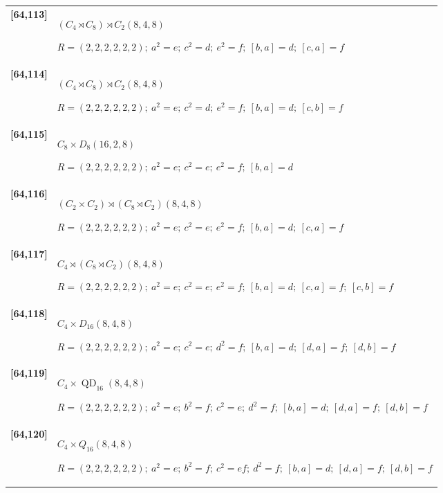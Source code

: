 \documentclass[UTF8,fontset=fandol,11pt,a4paper]{ctexart}
\begin{document}
\begin{longtable}{@{}p{17mm}>{\raggedright\arraybackslash}p{141mm}@{}}
\textbf{[64,113]} & $(C_{4}\rtimes C_{8})\rtimes C_{2}$\quad $(8,4,8)$\par\(R=(2,2,2,2,2,2);\allowbreak\ a^{2}=e;\allowbreak\ c^{2}=d;\allowbreak\ e^{2}=f;\allowbreak\ [b,a]=d;\allowbreak\ [c,a]=f\)\\[3pt]

\textbf{[64,114]} & $(C_{4}\rtimes C_{8})\rtimes C_{2}$\quad $(8,4,8)$\par\(R=(2,2,2,2,2,2);\allowbreak\ a^{2}=e;\allowbreak\ c^{2}=d;\allowbreak\ e^{2}=f;\allowbreak\ [b,a]=d;\allowbreak\ [c,b]=f\)\\[3pt]

\textbf{[64,115]} & $C_{8}\times D_{8}$\quad $(16,2,8)$\par\(R=(2,2,2,2,2,2);\allowbreak\ a^{2}=e;\allowbreak\ c^{2}=e;\allowbreak\ e^{2}=f;\allowbreak\ [b,a]=d\)\\[3pt]

\textbf{[64,116]} & $(C_{2}\times C_{2})\rtimes (C_{8}\rtimes C_{2})$\quad $(8,4,8)$\par\(R=(2,2,2,2,2,2);\allowbreak\ a^{2}=e;\allowbreak\ c^{2}=e;\allowbreak\ e^{2}=f;\allowbreak\ [b,a]=d;\allowbreak\ [c,a]=f\)\\[3pt]

\textbf{[64,117]} & $C_{4}\rtimes (C_{8}\rtimes C_{2})$\quad $(8,4,8)$\par\(R=(2,2,2,2,2,2);\allowbreak\ a^{2}=e;\allowbreak\ c^{2}=e;\allowbreak\ e^{2}=f;\allowbreak\ [b,a]=d;\allowbreak\ [c,a]=f;\allowbreak\ [c,b]=f\)\\[3pt]

\textbf{[64,118]} & $C_{4}\times D_{16}$\quad $(8,4,8)$\par\(R=(2,2,2,2,2,2);\allowbreak\ a^{2}=e;\allowbreak\ c^{2}=e;\allowbreak\ d^{2}=f;\allowbreak\ [b,a]=d;\allowbreak\ [d,a]=f;\allowbreak\ [d,b]=f\)\\[3pt]

\textbf{[64,119]} & $C_{4}\times \operatorname{QD}_{16}$\quad $(8,4,8)$\par\(R=(2,2,2,2,2,2);\allowbreak\ a^{2}=e;\allowbreak\ b^{2}=f;\allowbreak\ c^{2}=e;\allowbreak\ d^{2}=f;\allowbreak\ [b,a]=d;\allowbreak\ [d,a]=f;\allowbreak\ [d,b]=f\)\\[3pt]

\textbf{[64,120]} & $C_{4}\times Q_{16}$\quad $(8,4,8)$\par\(R=(2,2,2,2,2,2);\allowbreak\ a^{2}=e;\allowbreak\ b^{2}=f;\allowbreak\ c^{2}=ef;\allowbreak\ d^{2}=f;\allowbreak\ [b,a]=d;\allowbreak\ [d,a]=f;\allowbreak\ [d,b]=f\)\\[3pt]


\end{longtable}
\end{document}
